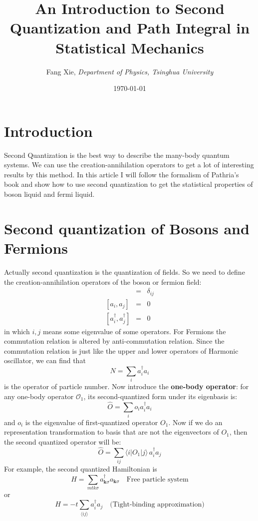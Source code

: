 \documentclass{article}
\author{Fang Xie, \emph{Department of Physics, Tsinghua University}}
\title{{\bf{An Introduction to Second Quantization and Path Integral in Statistical Mechanics}}}
\date{\today}
\newcommand{\mtk}{\mathbf{k}}
\begin{document}
\maketitle
\section{Introduction}
Second Quantization is the best way to describe the many-body quantum systems. We can use the creation-annihilation operators to get a lot of interesting results by this method. In this article I will follow the formalism of Pathria's book and show how to use second quantization to get the statistical properties of boson liquid and fermi liquid.

\section{Second quantization of Bosons and Fermions}
Actually second quantization is the quantization of fields. So we need to define the creation-annihilation operators of the boson or fermion field:
\begin{eqnarray}
[a_i,a^\dagger_j] &=& \delta_{ij}\\
\left[a_i,a_j\right] &=& 0 \\
\left[a^\dagger_i,a^\dagger_j\right] &=& 0 
\end{eqnarray}
in which $i,j$ means some eigenvalue of some operators. For Fermions the commutation relation is altered by anti-commutation relation. Since the commutation relation is just like the upper and lower operators of Harmonic oscillator, we can find that
$$
N = \sum_i a^\dagger_i a_i 
$$
is the operator of particle number.
Now introduce the {\bf{one-body operator}}: for any one-body operator $\mathcal{O}_1$, its second-quantized form under its eigenbasis is:
\begin{equation}
\hat{O} = \sum_{i}o_i a^\dagger_i a_i
\end{equation}
and $o_i$ is the eigenvalue of first-quantized operator $O_1$. Now if we do an representation transformation to basis that are not the eigenvectors of $O_1$, then the second quantized operator will be:
$$
\hat{O} = \sum_{ij}\langle i | O_1|j\rangle\, a^\dagger_i a_j
$$
For example, the second quantized Hamiltonian is
$$
H = \sum_{mtk\sigma}a^\dagger_{\mtk\sigma}a_{\mtk\sigma} \quad\textrm{Free particle system}
$$
or
$$
H = -t\sum_{\langle ij \rangle}a^\dagger_i a_j\quad \textrm{(Tight-binding approximation)}
$$

\section{}
\end{document}
